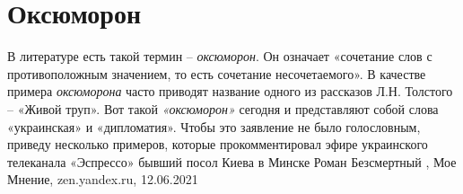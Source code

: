  
 
 
 
 
\chapter{Оксюморон}
\label{sec:slova.oksjumoron}

В литературе есть такой термин – \emph{оксюморон}. Он означает «сочетание слов с
противоположным значением, то есть сочетание несочетаемого». В качестве примера
\emph{оксюморона} часто приводят название одного из рассказов Л.Н. Толстого – «Живой
труп». Вот такой \emph{«оксюморон»} сегодня и представляют собой слова «украинская» и
«дипломатия». Чтобы это заявление не было голословным, приведу несколько
примеров, которые прокомментировал эфире украинского телеканала «Эспрессо»
бывший посол Киева в Минске Роман Безсмертный
, 
Мое Мнение, zen.yandex.ru, 12.06.2021

